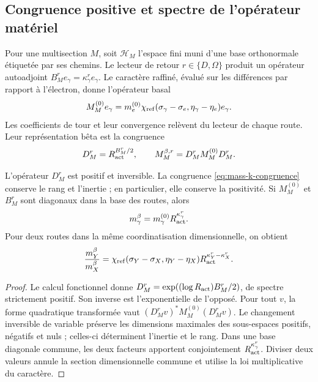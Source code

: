 \subsection{Congruence positive et spectre de l'opérateur matériel}

Pour une multisection \(M\), soit \(\mathscr H_M\) l'espace fini muni d'une base orthonormale étiquetée par ses chemins. Le lecteur de retour \(r\in\{D,\Omega\}\) produit un opérateur autoadjoint \(B_M^r e_\gamma=\kappa_\gamma^r e_\gamma\). Le caractère raffiné, évalué sur les différences par rapport à l'électron, donne l'opérateur basal
\[
 M_M^{(0)}e_\gamma=
 m_e^{(0)}\chi_{\rm ref}(\sigma_\gamma-\sigma_e,
                  \eta_\gamma-\eta_e)e_\gamma.
\]
Les coefficients de tour et leur convergence relèvent du lecteur de chaque route. Leur représentation bêta est la congruence
\begin{equation}
 D_M^r=R_{\rm act}^{B_M^r/2},\qquad
 M_M^{\beta,r}=D_M^rM_M^{(0)}D_M^r.
 \label{eq:mass-k-congruence}
\end{equation}

\begin{proposition}
L’opérateur \(D_M^r\) est positif et inversible. La congruence
\eqref{eq:mass-k-congruence} conserve le rang et l’inertie ; en particulier,
elle conserve la positivité. Si \(M_M^{(0)}\) et \(B_M^r\) sont diagonaux
dans la base des routes, alors
\[
 m_\gamma^\beta=m_\gamma^{(0)}R_{\rm act}^{\kappa_\gamma^r}.
\]
Pour deux routes dans la même coordinatisation dimensionnelle, on obtient
\[
 \frac{m_Y^\beta}{m_X^\beta}=
 \chi_{\rm ref}(\sigma_Y-\sigma_X,\eta_Y-\eta_X)
 R_{\rm act}^{\kappa_Y^r-\kappa_X^r}.
\]
\end{proposition}
\begin{proof}
Le calcul fonctionnel donne \(D_M^r=\exp((\log R_{\rm act})B_M^r/2)\), de spectre strictement positif. Son inverse est l'exponentielle de l'opposé. Pour tout \(v\), la forme quadratique transformée vaut \((D_M^rv)^*M_M^{(0)}(D_M^rv)\). Le changement inversible de variable préserve les dimensions maximales des sous-espaces positifs, négatifs et nuls ; celles-ci déterminent l'inertie et le rang. Dans une base diagonale commune, les deux facteurs apportent conjointement \(R_{\rm act}^{\kappa_\gamma^r}\). Diviser deux valeurs annule la section dimensionnelle commune et utilise la loi multiplicative du caractère.
\end{proof}

